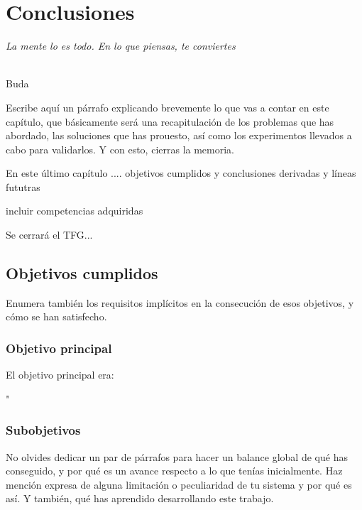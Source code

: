 \chapter{Conclusiones}
\label{cap:capitulo8}

\begin{flushright}
\begin{minipage}[]{10cm}
\emph{La mente lo es todo. En lo que piensas, te conviertes}\\
\end{minipage}\\

Buda\\
\end{flushright}

\vspace{1cm}

Escribe aquí un párrafo explicando brevemente lo que vas a contar en este capítulo, que básicamente será una recapitulación de los problemas que has abordado, las soluciones que has prouesto, así como los experimentos llevados a cabo para validarlos. Y con esto, cierras la memoria.

En este último capítulo .... objetivos cumplidos y conclusiones derivadas y líneas fututras 

incluir competencias adquiridas 

Se cerrará el TFG...

\section{Objetivos cumplidos}

Enumera también los requisitos implícitos en la consecución de esos objetivos, y cómo se han satisfecho.\\

\subsection{Objetivo principal}
El objetivo principal era: 

"

\subsection{Subobjetivos}

No olvides dedicar un par de párrafos para hacer un balance global de qué has conseguido, y por qué es un avance respecto a lo que tenías inicialmente. Haz mención expresa de alguna limitación o peculiaridad de tu sistema y por qué es así. Y también, qué has aprendido desarrollando este trabajo.\\

